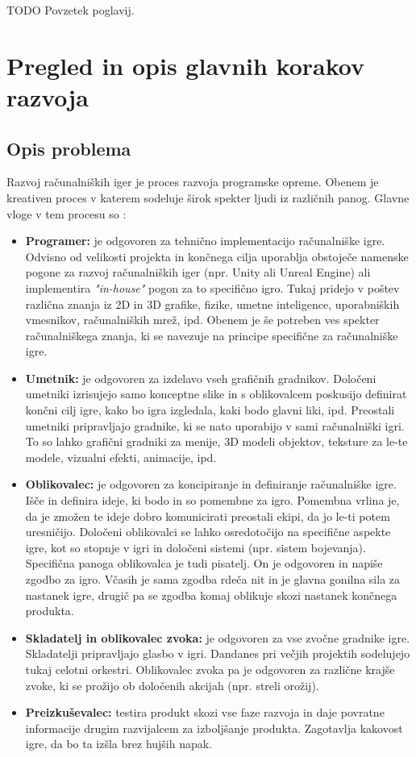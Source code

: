 \documentclass[12pt,a4paper,twoside]{book}
\begin{document}
TODO Povzetek poglavij.

\chapter{Pregled in opis glavnih korakov razvoja}
\thispagestyle{fancy}
\section{Opis problema}
\label{sec:opis_problema}
Razvoj računalniških iger je proces razvoja programske opreme. Obenem je kreativen proces v katerem sodeluje širok spekter ljudi iz različnih panog. Glavne vloge v tem procesu so \cite{rogers2014level}:
\begin{itemize}
	\item \textbf{Programer:} je odgovoren za tehnično implementacijo računalniške igre. Odvisno od velikosti projekta in končnega cilja uporablja obstoječe namenske pogone za razvoj računalniških iger (npr. Unity ali Unreal Engine) ali implementira \textit{"in-house"} pogon za to specifično igro. Tukaj pridejo v poštev različna znanja iz 2D in 3D grafike, fizike, umetne inteligence, uporabniških vmesnikov, računalniških mrež, ipd. Obenem je še potreben ves spekter računalniškega znanja, ki se navezuje na principe specifične za računalniške igre.
	\item \textbf{Umetnik:} je odgovoren za izdelavo vseh grafičnih gradnikov. Določeni umetniki izrisujejo samo konceptne slike in s oblikovalcem poskusijo definirat končni cilj igre, kako bo igra izgledala, kaki bodo glavni liki, ipd. Preostali umetniki pripravljajo gradnike, ki se nato uporabijo v sami računalniški igri. To so lahko grafični gradniki za menije, 3D modeli objektov, teksture za le-te modele, vizualni efekti, animacije, ipd.
	\item \textbf{Oblikovalec:} je odgovoren za koncipiranje in definiranje računalniške igre. Išče in definira ideje, ki bodo in so pomembne za igro. Pomembna vrlina je, da je zmožen te ideje dobro komunicirati preostali ekipi, da jo le-ti potem uresničijo. Določeni oblikovalci se lahko osredotočijo na specifične aspekte igre, kot so stopnje v igri in določeni sistemi (npr. sistem bojevanja).
	Specifična panoga oblikovalca je tudi pisatelj. On je odgovoren in napiše zgodbo za igro. Včasih je sama zgodba rdeča nit in je glavna gonilna sila za nastanek igre, drugič pa se zgodba komaj oblikuje skozi nastanek končnega produkta.
	\item \textbf{Skladatelj in oblikovalec zvoka:} je odgovoren za vse zvočne gradnike igre. Skladatelji pripravljajo glasbo v igri. Dandanes pri večjih projektih sodelujejo tukaj celotni orkestri. Oblikovalec zvoka pa je odgovoren za različne krajše zvoke, ki se prožijo ob določenih akcijah (npr. streli orožij).
	\item \textbf{Preizkuševalec:} testira produkt skozi vse faze razvoja in daje povratne informacije drugim razvijalcem za izboljšanje produkta. Zagotavlja kakovost igre, da bo ta izšla brez hujših napak.
\end{itemize}
\end{document}
